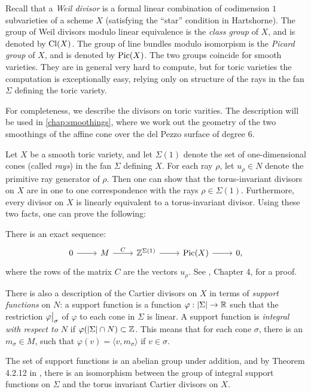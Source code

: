 Recall that a \emph{Weil divisor} is a formal linear combination of codimension $1$ subvarieties of a scheme $X$ (satisfying the ``star'' condition in Hartshorne). The group of Weil divisors modulo linear equivalence is the \emph{class group} of $X$, and is denoted by $\operatorname{Cl}(X)$. The group of line bundles modulo isomorpism is the \emph{Picard group} of $X$, and is denoted by $\operatorname{Pic}(X)$. The two groups coincide for smooth varieties. They are in general very hard to compute, but for toric varieties the computation is exceptionally easy, relying only on structure of the rays in the fan $\Sigma$ defining the toric variety.

For completeness, we describe the divisors on toric varities. The description will be used in \cref{chap:smoothings}, where we work out the geometry of the two smoothings of the affine cone over the del Pezzo surface of degree $6$.

Let $X$ be a smooth toric variety, and let $\Sigma(1)$ denote the set of one-dimensional cones (called \emph{rays}) in the fan $\Sigma$ defining $X$. For each ray $\rho$, let $u_\rho \in N$ denote the primitive ray generator of $\rho$. Then one can show that the torus-invariant divisors on $X$ are in one to one correspondence with the rays $\rho \in \Sigma(1)$. Furthermore, every divisor on $X$ is linearly equivalent to a torus-invariant divisor. Using these two facts, one can prove the following:

There is an exact sequence:
\[
\begin{tikzcd}
0 \arrow{r} &  M \arrow{r}{C} & \Z^{\Sigma(1)}\arrow{r} & \Pic(X)   \arrow{r} & 0,
\end{tikzcd}
\]
where the rows of the matrix $C$ are the vectors $u_{\rho}$. See \cite{cox_toric}, Chapter 4, for a proof.

There is also a description of the Cartier divisors on $X$ in terms of \emph{support functions} on $N$: a support function is a function $\varphi:|\Sigma| \to \mathbb{R}$ such that the restriction $\restr{\varphi}{\sigma}$ of $\varphi$ to each cone in $\Sigma$ is linear. A support function is \emph{integral with respect to $N$} if $\varphi(|\Sigma| \cap N) \subset \mathbb{Z}$. This means that for each cone $\sigma$, there is an $m_\sigma \in M$, such that $\varphi(v)=\langle v, m_\sigma \rangle$ if $v \in \sigma$.

The set of support functions is an abelian group under addition, and by Theorem 4.2.12 in \cite{cox_toric}, there is an isomorphism between the group of integral support functions on $\Sigma$ and the torus invariant Cartier divisors on $X$.

